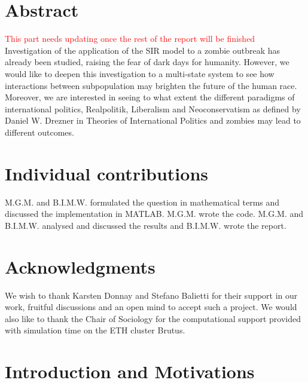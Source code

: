 \documentclass[11pt]{article}
\begin{document}
\section{Abstract}\indent
\textcolor{red} {This part needs updating once the rest of the report will be finished}\\
Investigation of the application of the SIR model to a zombie outbreak has already been studied, raising the fear of dark days for humanity. However, we would like to deepen this investigation to a multi-state system to see how interactions between subpopulation may brighten the future of the human race. Moreover, we are interested in seeing to what extent the different paradigms of international politics, Realpolitik, Liberalism and Neoconservatism as defined by Daniel W. Drezner in Theories of International Politics and zombies may lead to different outcomes.

\section{Individual contributions}\indent

M.G.M. and B.I.M.W. formulated the question in mathematical terms and discussed the implementation in MATLAB. M.G.M. wrote the code. M.G.M. and B.I.M.W. analysed and discussed the results and B.I.M.W. wrote the report.

\section{Acknowledgments}\indent

We wish to thank Karsten Donnay and Stefano Balietti for their support in our work, fruitful discussions and an open mind to accept such a project. We would also like to thank the Chair of Sociology for the computational support provided with simulation time on the ETH cluster Brutus.

\newpage

\section{Introduction and Motivations}\indent
\end{document}
